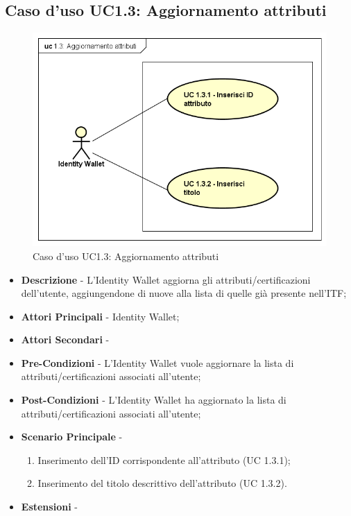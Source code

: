 \subsection{Caso d'uso UC1.3: Aggiornamento attributi}
\begin{figure}[h]
	\centering
	\includegraphics[scale=0.50]{immagini/usecase/UC13_AggiornamentoAttributi}
	\caption{Caso d'uso UC1.3: Aggiornamento attributi}
\end{figure}
\begin{itemize}
	\item \textbf{Descrizione} - L'Identity Wallet aggiorna gli attributi/certificazioni dell'utente, aggiungendone di nuove alla lista di quelle già presente nell'\gls{ITF};
	\item \textbf{Attori Principali} - Identity Wallet;
	\item \textbf{Attori Secondari} -
	\item \textbf{Pre-Condizioni} - L'Identity Wallet vuole aggiornare la lista di attributi/certificazioni associati all'utente;
	\item \textbf{Post-Condizioni} - L'Identity Wallet ha aggiornato la lista di attributi/certificazioni associati all'utente;
	\item \textbf{Scenario Principale} -
	\begin{enumerate}
		\item Inserimento dell'ID corrispondente all'attributo (UC 1.3.1);
		\item Inserimento del titolo descrittivo dell'attributo (UC 1.3.2).
	\end{enumerate}
	\item \textbf{Estensioni} -
\end{itemize}
